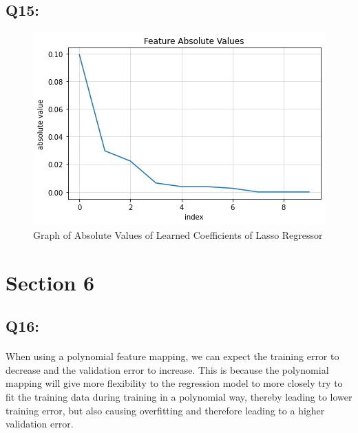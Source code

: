 \documentclass{article}
\begin{document}
\subsection*{Q15:}
    \begin{figure}[H]
        \centering
        \includegraphics[scale=0.7]{q15.png}
        \caption{Graph of Absolute Values of Learned Coefficients of Lasso Regressor}
        \label{fig:q15}
    \end{figure}
    \paragraph*{}

\section*{Section 6}
\subsection*{Q16:}
    \paragraph*{}
    When using a polynomial feature mapping, we can expect the training error to decrease and the validation error to increase. This is because the polynomial mapping will give more flexibility to the regression model to more closely try to fit the training data during training in a polynomial way, thereby leading to lower training error, but also causing overfitting and therefore leading to a higher validation error.
\end{document}
